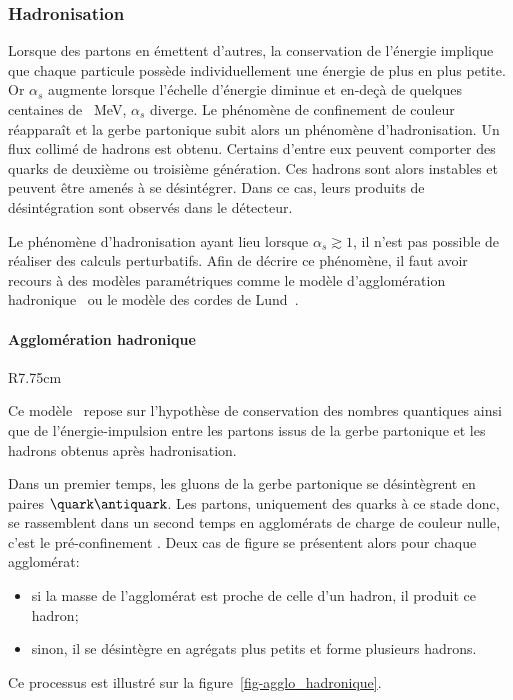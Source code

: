 \subsubsection{Hadronisation}\label{chapter-MSSM-formation_jets-subsec-hadronisation}
Lorsque des partons en émettent d'autres, la conservation de l'énergie implique que chaque particule possède individuellement une énergie de plus en plus petite.
Or $\alpha_s$ augmente lorsque l'échelle d'énergie diminue et en-deçà de quelques centaines de \SI{}{\MeV}, $\alpha_s$ diverge.
Le phénomène de confinement de couleur réapparaît et la gerbe partonique subit alors un phénomène d'hadronisation.
Un flux collimé de hadrons est obtenu.
Certains d'entre eux peuvent comporter des quarks de deuxième ou troisième génération. Ces hadrons sont alors instables et peuvent être amenés à se désintégrer.
Dans ce cas, leurs produits de désintégration sont observés dans le détecteur.
\par Le phénomène d'hadronisation ayant lieu lorsque $\alpha_s\gtrsim1$, il n'est pas possible de réaliser des calculs perturbatifs. Afin de décrire ce phénomène, il faut avoir recours à des modèles paramétriques comme
le modèle d'agglomération hadronique~\cite{Winter_2004}
ou
le modèle des cordes de Lund~\cite{Andersson_parton_fragmentation}.
\paragraph{Agglomération hadronique}\label{chapter-MSSM-formation_jets-subsec-hadronisation-subsubsec-agglo_hadronique}
\begin{wrapfigure}{R}{7.75cm}
\centering

\caption[Formation de jets dans le cadre du modèle d'agglomération hadronique.]{Schématisation de l'hadronisation dans le cadre du modèle d'agglomération hadronique.}
\label{fig-agglo_hadronique}
\end{wrapfigure}
Ce modèle~\cite{Winter_2004} repose sur l'hypothèse de conservation des nombres quantiques ainsi que de l'énergie-impulsion entre les partons issus de la gerbe partonique et les hadrons obtenus après hadronisation.
\par Dans un premier temps, les gluons de la gerbe partonique se désintègrent en paires $\quark\antiquark$. Les partons, uniquement des quarks à ce stade donc, se rassemblent dans un second temps en agglomérats de charge de couleur nulle, c'est le \og pré-confinement \fg.
Deux cas de figure se présentent alors pour chaque agglomérat:
\begin{itemize}
\item si la masse de l'agglomérat est proche de celle d'un hadron, il produit ce hadron;
\item sinon, %
il se désintègre en agrégats plus petits et forme plusieurs hadrons.
\end{itemize}
Ce processus est illustré sur la figure~\ref{fig-agglo_hadronique}.
